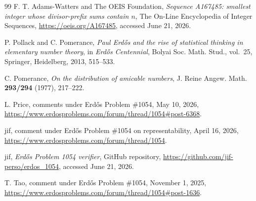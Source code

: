 \documentclass[11pt]{article}
\theoremstyle{definition}
\theoremstyle{remark}
\begin{document}
\begin{thebibliography}{99}
F. T. Adams-Watters and The OEIS Foundation,
\emph{Sequence A167485: smallest integer whose divisor-prefix sums contain $n$},
The On-Line Encyclopedia of Integer Sequences,
\url{https://oeis.org/A167485},
accessed June 21, 2026.

P. Pollack and C. Pomerance,
\emph{Paul Erd\H{o}s and the rise of statistical thinking in elementary number theory},
in \emph{Erd\H{o}s Centennial}, Bolyai Soc. Math. Stud., vol.~25,
Springer, Heidelberg, 2013, 515--533.

C. Pomerance,
\emph{On the distribution of amicable numbers},
J. Reine Angew. Math. \textbf{293/294} (1977), 217--222.

L. Price,
comments under Erd\H{o}s Problem \#1054,
May 10, 2026,
\url{https://www.erdosproblems.com/forum/thread/1054#post-6368}.

jif,
comment under Erd\H{o}s Problem \#1054 on representability,
April 16, 2026,
\url{https://www.erdosproblems.com/forum/thread/1054}.

jif,
\emph{Erd\H{o}s Problem 1054 verifier},
GitHub repository,
\url{https://github.com/jif-perso/erdos_1054},
accessed June 21, 2026.

T. Tao,
comment under Erd\H{o}s Problem \#1054,
November 1, 2025,
\url{https://www.erdosproblems.com/forum/thread/1054#post-1636}.

\end{thebibliography}
\end{document}
